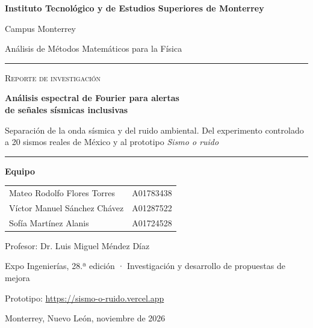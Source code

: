 \documentclass[11pt,letterpaper]{article}
\begin{document}

\begin{titlepage}
\centering
{\large\bfseries Instituto Tecnológico y de Estudios Superiores de Monterrey\par}
\vspace{2pt}
{\large Campus Monterrey\par}
\vspace{1.2cm}
{\large Análisis de Métodos Matemáticos para la Física\par}
\vfill
{\color{navy}\rule{\textwidth}{1.2pt}}\par\vspace{0.6cm}
{\large\scshape Reporte de investigación\par}\vspace{0.3cm}
{\fontsize{24}{30}\selectfont\bfseries Análisis espectral de Fourier para alertas\\[4pt] de señales sísmicas inclusivas\par}
\vspace{0.5cm}
{\large Separación de la onda sísmica y del ruido ambiental. Del experimento controlado a 20 sismos reales de México y al prototipo \textit{Sismo o ruido}\par}
\vspace{0.6cm}
{\color{navy}\rule{\textwidth}{1.2pt}}\par
\vfill
{\large\bfseries Equipo\par}
\vspace{6pt}
\begin{tabular}{ll}
Mateo Rodolfo Flores Torres & A01783438\\
Víctor Manuel Sánchez Chávez & A01287522\\
Sofía Martínez Alanis & A01724528\\
\end{tabular}
\par\vspace{0.8cm}
{\large Profesor: Dr. Luis Miguel Méndez Díaz\par}
\vspace{4pt}
{\normalsize Expo Ingenierías, 28.ª edición · Investigación y desarrollo de propuestas de mejora\par}
\vspace{4pt}
{\normalsize Prototipo: \url{https://sismo-o-ruido.vercel.app}\par}
\vspace{1.0cm}
{\large Monterrey, Nuevo León, noviembre de 2026\par}
\end{titlepage}
\end{document}
